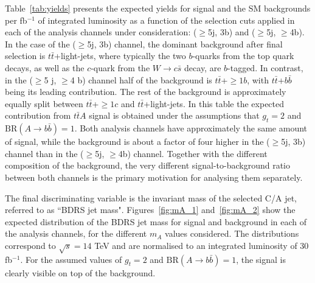\documentclass[preprintnumbers,superscriptaddress,nofootinbib,aps,prd,floatfix]{revtex4}
\newcommand{\ttbar}{\ensuremath{t\bar{t}}}
\newcommand{\BR} {\ensuremath{\mathrm{BR}}}
\begin{document}
Table~\ref{tab:yields} presents the expected yields for signal and the SM backgrounds 
per fb$^{-1}$ of integrated luminosity as a function of the selection cuts applied in each
of the analysis channels under consideration: ($\geq$5j, 3b) and ($\geq$5j, $\geq$4b).
In the case of the ($\geq$5j, 3b) channel, the dominant background after final selection
is $\ttbar$+light-jets, where typically the two $b$-quarks from the  top quark decays, as well as
the $c$-quark from the $W \to c\bar{s}$ decay, are $b$-tagged.
In contrast, in the ($\geq$5 j, $\geq$4 b) channel half of the background is $\ttbar$+$\geq$$1b$,
with $\ttbar$+$b\bar{b}$ being its leading contribution. The rest of the background is approximately 
equally split between $\ttbar$+$\geq$$1c$ and $\ttbar$+light-jets.
In this table the expected contribution from $\ttbar A$ signal is obtained under the assumptions that $g_t=2$ and $\BR(A\to b\bar{b})=1$.
Both analysis channels have approximately the same amount of signal, while the background
is about a factor of four higher in the ($\geq$5j, 3b) channel than in the  ($\geq$5j, $\geq$4b) channel.
Together with the different composition of the background, the very different signal-to-background
ratio between both channels is the primary motivation for analysing them separately.

The final discriminating variable is the invariant mass of the selected C/A jet, referred to as 
``BDRS jet mass". Figures~\ref{fig:mA_1} and~\ref{fig:mA_2} show the expected distribution of the BDRS jet mass
for signal and background in each of the analysis channels, for the different $m_A$ values considered. The distributions
correspond to $\sqrt{s}=14$ TeV and are normalised to an integrated luminosity of 30 fb$^{-1}$.
For the assumed values of $g_t=2$ and $\BR(A\to b\bar{b})=1$, the signal is clearly visible
on top of the background.
\end{document}
